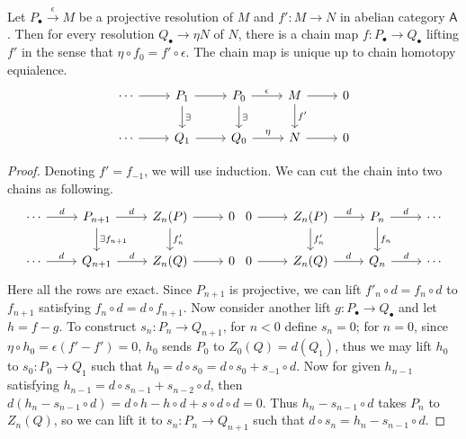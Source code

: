\begin{thm} Let $P_\bullet\xrightarrow{\epsilon} M$ be a projective resolution of $M$ and $f':M\rightarrow N$ in abelian category $\mathsf{A}$. Then for every resolution $Q_\bullet\rightarrow{\eta} N$ of $N$, there is a chain map $f:P_\bullet\rightarrow Q_\bullet$ lifting $f'$ in the sense that $\eta\circ f_0=f'\circ \epsilon$. The chain map is unique up to chain homotopy equialence.
\begin{equation}
\begin{tikzcd}
\cdots\arrow[r]& P_1\arrow[r]\arrow{d}{\exists} &P_0\arrow{r}{\epsilon} \arrow{d}{\exists} &M\arrow[r] \arrow{d}{f'} &0\\
\cdots\arrow[r]& Q_1\arrow[r] & Q_0\arrow{r}{\eta} & N\arrow[r] &0
\end{tikzcd}
\end{equation}
\end{thm}
\begin{proof}
Denoting $f'=f_{-1}$, we will use induction. We can cut the chain into two chains as following.
\begin{equation}
\begin{tikzcd}
\cdots\arrow{r}{d} & P_{n+1}\arrow{r}{d}\arrow{d}{\exists f_{n+1}}&Z_n(P)\arrow[r]\arrow{d}{f'_n}&0\\
\cdots\arrow{r}{d} & Q_{n+1}\arrow{r}{d}&Z_n(Q)\arrow[r]&0
\end{tikzcd}
\begin{tikzcd}
0\arrow[r] & Z_n(P)\arrow{r}{d}\arrow{d}{f'_n}&P_n\arrow{r}{d}\arrow{d}{f_n}&\cdots\\
0\arrow[r]&Z_n(Q)\arrow{r}{d}&Q_n\arrow{r}{d}&\cdots
\end{tikzcd}
\end{equation}
Here all the rows are exact. Since $P_{n+1}$ is projective, we can lift $f'_n\circ d=f_n\circ d$ to $f_{n+1}$ satisfying $f_n\circ d=d\circ f_{n+1}$. Now consider another lift $g:P_\bullet\rightarrow Q_\bullet$ and let $h=f-g$. To construct $s_n:P_n\rightarrow Q_{n+1}$, for $n<0$ define $s_n=0$; for $n=0$, since $\eta\circ h_0=\epsilon(f'-f')=0$, $h_0$ sends $P_0$ to $Z_0(Q)=d(Q_1)$, thus we may lift $h_0$ to $s_0:P_0\rightarrow Q_1$ such that $h_0=d\circ s_0=d\circ s_0+s_{-1}\circ d$. Now for given $h_{n-1}$ satisfying $h_{n-1}=d\circ s_{n-1}+s_{n-2}\circ d$, then $d(h_n-s_{n-1}\circ d)=d\circ h-h\circ d+s\circ d\circ d=0$. Thus $h_n-s_{n-1}\circ d$ takes $P_n$ to $Z_n(Q)$, so we can lift it to $s_n:P_n\rightarrow Q_{n+1}$ such that $d\circ s_n=h_n-s_{n-1}\circ d$. 
\end{proof}

